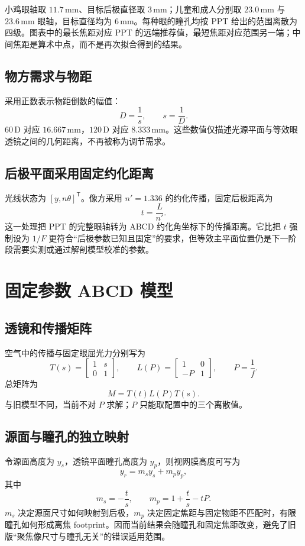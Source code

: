 \documentclass[UTF8,zihao=-4,openany,fontset=none]{ctexrep}
\newcommand{\D}{\,\mathrm{D}}
\newcommand{\mm}{\,\mathrm{mm}}
\begin{document}
小鸡眼轴取 $11.7\mm$、目标后极直径取 $3\mm$；儿童和成人分别取 $23.0\mm$ 与 $23.6\mm$ 眼轴，目标直径均为 $6\mm$。每种眼的瞳孔均按 PPT 给出的范围离散为四级。图表中的最长焦距对应 PPT 的远端推荐值，最短焦距对应范围另一端；中间焦距是算术中点，而不是再次拟合得到的结果。

\section{物方需求与物距}
采用正数表示物距倒数的幅值：
\[
D=\frac{1}{s},\qquad s=\frac{1}{D}.
\]
$60\D$ 对应 $16.667\mm$，$120\D$ 对应 $8.333\mm$。这些数值仅描述光源平面与等效眼透镜之间的几何距离，不再被称为调节需求。

\section{后极平面采用固定约化距离}
光线状态为 $[y,n\theta]^\mathsf{T}$。像方采用 $n'=1.336$ 的约化传播，固定后极距离为
\[
t=\frac{L}{n'}.
\]
这一处理把 PPT 的完整眼轴转为 ABCD 约化角坐标下的传播距离。它比把 $t$ 强制设为 $1/F$ 更符合“后极参数已知且固定”的要求，但等效主平面位置仍是下一阶段需要实测或通过解剖模型校准的参数。

\chapter{固定参数 ABCD 模型}

\section{透镜和传播矩阵}
空气中的传播与固定眼屈光力分别写为
\[
T(s)=\begin{bmatrix}1&s\\0&1\end{bmatrix},\qquad
L(P)=\begin{bmatrix}1&0\\-P&1\end{bmatrix},\qquad P=\frac{1}{f}.
\]
总矩阵为
\[
M=T(t)L(P)T(s).
\]
与旧模型不同，当前不对 $P$ 求解；$P$ 只能取配置中的三个离散值。

\section{源面与瞳孔的独立映射}
令源面高度为 $y_s$，透镜平面瞳孔高度为 $y_p$，则视网膜高度可写为
\[
y_r=m_s y_s+m_p y_p,
\]
其中
\[
m_s=-\frac{t}{s},\qquad
m_p=1+\frac{t}{s}-tP.
\]
$m_s$ 决定源面尺寸如何映射到后极，$m_p$ 决定固定焦距与固定物距不匹配时，有限瞳孔如何形成离焦 footprint。因而当前结果会随瞳孔和固定焦距改变，避免了旧版“聚焦像尺寸与瞳孔无关”的错误适用范围。
\end{document}
